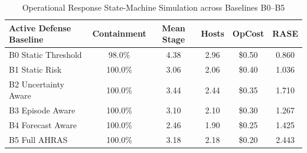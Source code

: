 \begin{table}[t]
\centering
\small
\caption{Operational Response State-Machine Simulation across Baselines B0--B5}
\label{tab:response_safety}
\begin{tabular}{lccccc}
\toprule
\textbf{Active Defense Baseline} & \textbf{Containment} & \textbf{Mean Stage} & \textbf{Hosts} & \textbf{OpCost} & \textbf{RASE} \\
\midrule
B0 Static Threshold & 98.0\% & 4.38 & 2.96 & \$0.50 & 0.860 \\
B1 Static Risk & 100.0\% & 3.06 & 2.06 & \$0.40 & 1.036 \\
B2 Uncertainty Aware & 100.0\% & 3.44 & 2.44 & \$0.35 & 1.710 \\
B3 Episode Aware & 100.0\% & 3.10 & 2.10 & \$0.30 & 1.267 \\
B4 Forecast Aware & 100.0\% & 2.46 & 1.90 & \$0.25 & 1.425 \\
B5 Full AHRAS & 100.0\% & 3.18 & 2.18 & \$0.20 & 2.443 \\
\bottomrule
\end{tabular}
\end{table}